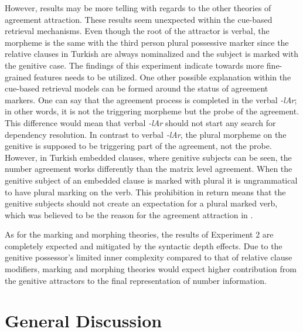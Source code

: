 \documentclass[doc,a4paper,man,natbib,floatsintext,noextraspace]{apa6}\usepackage[]{graphicx}\usepackage[]{color}
\begin{document}
However, results may be more telling with regards to the other theories of agreement attraction. These results seem unexpected within the cue-based retrieval mechanisms. Even though the root of the attractor is verbal, the morpheme is the same with the third person plural possessive marker since the relative clauses in Turkish are always nominalized and the subject is marked with the genitive case. The findings of this experiment indicate towards more fine-grained features needs to be utilized. One other possible explanation within the cue-based retrieval models can be formed around the status of agreement markers. One can say that the agreement process is completed in the verbal \textit{-lAr}; in other words, it is not the triggering morpheme but the probe of the agreement. This difference would mean that verbal \textit{-lAr} should not start any search for dependency resolution. In contrast to verbal \textit{-lAr}, the plural morpheme on the genitive is supposed to be triggering part of the agreement, not the probe. However, in Turkish embedded clauses, where genitive subjects can be seen, the number agreement works differently than the matrix level agreement. When the genitive subject of an embedded clause is marked with plural it is ungrammatical to have plural marking on the verb. 
This prohibition in return means that the genitive subjects should not create an expectation for a plural marked verb, which was believed to be the reason for the agreement attraction in \citet{LagoEtAl:2018}.


As for the marking and morphing theories, the results of Experiment 2 are completely expected and mitigated by the syntactic depth effects. Due to the genitive possessor's limited inner complexity compared to that of relative clause modifiers, marking and morphing theories would expect higher contribution from the genitive attractors to the final representation of number information. 


\section{General Discussion} \label{sec:general_discussion}




\end{document}
